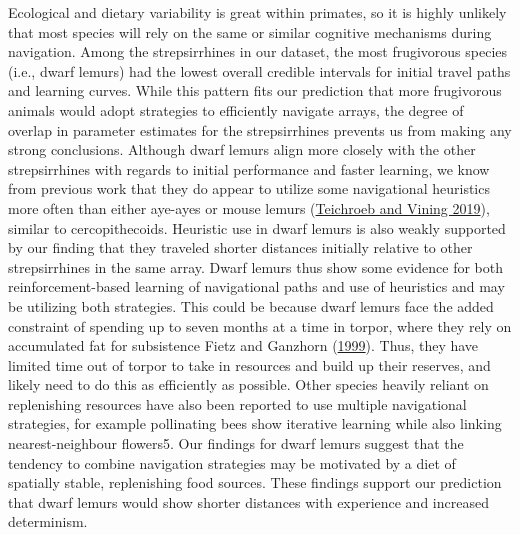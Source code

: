 \documentclass[twoside,12pt,final]{ucthesis-CA2012}
\begin{document}
\begin{ucmainmatter}
Ecological and dietary variability is great within primates, so it is highly unlikely that most species will rely on the same or similar cognitive mechanisms during navigation. Among the strepsirrhines in our dataset, the most frugivorous species (i.e., dwarf lemurs) had the lowest overall credible intervals for initial travel paths and learning curves. While this pattern fits our prediction that more frugivorous animals would adopt strategies to efficiently navigate arrays, the degree of overlap in parameter estimates for the strepsirrhines prevents us from making any strong conclusions. Although dwarf lemurs align more closely with the other strepsirrhines with regards to initial performance and faster learning, we know from previous work that they do appear to utilize some navigational heuristics more often than either aye-ayes or mouse lemurs (\protect\hyperlink{ref-teichroeb2019a}{Teichroeb and Vining 2019}), similar to cercopithecoids. Heuristic use in dwarf lemurs is also weakly supported by our finding that they traveled shorter distances initially relative to other strepsirrhines in the same array. Dwarf lemurs thus show some evidence for both reinforcement-based learning of navigational paths and use of heuristics and may be utilizing both strategies. This could be because dwarf lemurs face the added constraint of spending up to seven months at a time in torpor, where they rely on accumulated fat for subsistence Fietz and Ganzhorn (\protect\hyperlink{ref-fietz1999}{1999}). Thus, they have limited time out of torpor to take in resources and build up their reserves, and likely need to do this as efficiently as possible. Other species heavily reliant on replenishing resources have also been reported to use multiple navigational strategies, for example pollinating bees show iterative learning while also linking nearest-neighbour flowers5. Our findings for dwarf lemurs suggest that the tendency to combine navigation strategies may be motivated by a diet of spatially stable, replenishing food sources. These findings support our prediction that dwarf lemurs would show shorter distances with experience and increased determinism.


\end{ucmainmatter}
\end{document}
